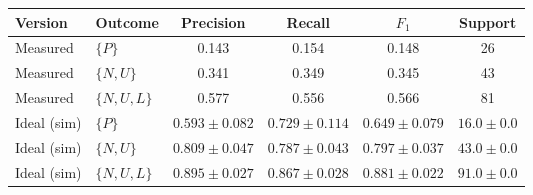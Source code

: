 \begin{tabular}{llcccc}
\toprule
Version & Outcome & Precision & Recall & $F_1$ & Support \\
\midrule
Measured & $\{P\}$ & 0.143 & 0.154 & 0.148 & 26 \\
Measured & $\{N,U\}$ & 0.341 & 0.349 & 0.345 & 43 \\
Measured & $\{N,U,L\}$ & 0.577 & 0.556 & 0.566 & 81 \\
Ideal (sim) & $\{P\}$ & $0.593 \pm 0.082$ & $0.729 \pm 0.114$ & $0.649 \pm 0.079$ & $16.0 \pm 0.0$ \\
Ideal (sim) & $\{N,U\}$ & $0.809 \pm 0.047$ & $0.787 \pm 0.043$ & $0.797 \pm 0.037$ & $43.0 \pm 0.0$ \\
Ideal (sim) & $\{N,U,L\}$ & $0.895 \pm 0.027$ & $0.867 \pm 0.028$ & $0.881 \pm 0.022$ & $91.0 \pm 0.0$ \\
\bottomrule
\end{tabular}
